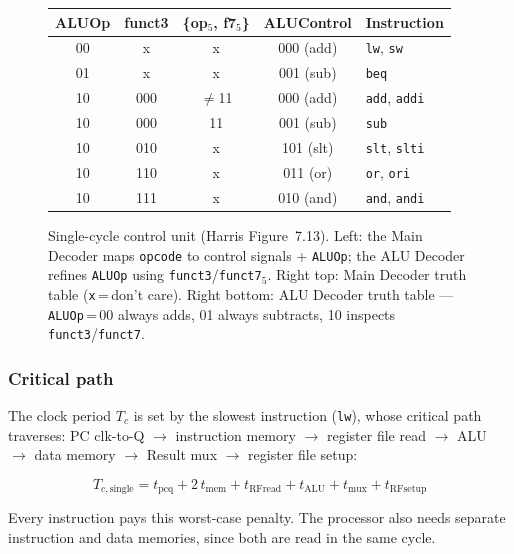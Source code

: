 \documentclass[9pt, a4paper]{extarticle}
\begin{document}
\begin{figure}[htbp]
\begin{minipage}[t]{0.68\textwidth}
        \vspace{6pt}
        \begin{tabular}{@{}c c c c l@{}}
            \toprule
            ALUOp & funct3 & \{op$_5$, f7$_5$\} & ALUControl & Instruction \\
            \midrule
            00 & x   & x  & 000 (add) & \texttt{lw}, \texttt{sw} \\
            01 & x   & x  & 001 (sub) & \texttt{beq} \\
            10 & 000 & $\neq$11 & 000 (add) & \texttt{add}, \texttt{addi} \\
            10 & 000 & 11 & 001 (sub) & \texttt{sub} \\
            10 & 010 & x  & 101 (slt) & \texttt{slt}, \texttt{slti} \\
            10 & 110 & x  & 011 (or)  & \texttt{or}, \texttt{ori} \\
            10 & 111 & x  & 010 (and) & \texttt{and}, \texttt{andi} \\
            \bottomrule
        \end{tabular}
    \end{minipage}
    \caption{Single-cycle control unit (Harris Figure~7.13). Left: the Main Decoder maps \texttt{opcode} to control signals + \texttt{ALUOp}; the ALU Decoder refines \texttt{ALUOp} using \texttt{funct3}/\texttt{funct7$_5$}. Right top: Main Decoder truth table (\texttt{x}\,=\,don't care). Right bottom: ALU Decoder truth table --- \texttt{ALUOp}\,=\,00 always adds, 01 always subtracts, 10 inspects \texttt{funct3}/\texttt{funct7}.}
    \label{fig:control-unit}
    \label{tab:main-decoder}
    \label{tab:alu-decoder}
\end{figure}


\subsubsection{Critical path} The clock period $T_c$ is set by the slowest instruction (\texttt{lw}), whose critical path traverses: PC clk-to-Q $\to$ instruction memory $\to$ register file read $\to$ ALU $\to$ data memory $\to$ Result mux $\to$ register file setup:

$$
T_{c,\text{single}} = t_{\text{pcq}} + 2\,t_{\text{mem}} + t_{\text{RFread}} + t_{\text{ALU}} + t_{\text{mux}} + t_{\text{RFsetup}}
$$

Every instruction pays this worst-case penalty. The processor also needs separate instruction and data memories, since both are read in the same cycle.
\end{document}

